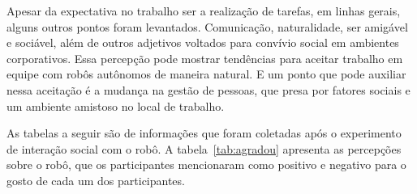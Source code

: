 Apesar da expectativa no trabalho ser a realização de tarefas, em linhas gerais, alguns outros pontos foram levantados. Comunicação, naturalidade, ser amigável e sociável, além de outros adjetivos voltados para convívio social em ambientes corporativos. Essa percepção pode mostrar tendências para aceitar trabalho em equipe com robôs autônomos de maneira natural.  E um ponto que pode auxiliar nessa aceitação é a mudança na gestão de pessoas, que presa por fatores sociais e um ambiente amistoso no local de trabalho. 

As tabelas a seguir são de informações que foram coletadas após o experimento de interação social com o robô. A tabela~\ref{tab:agradou} apresenta as percepções sobre o robô, que os participantes mencionaram como positivo e negativo para o gosto de cada um dos participantes.


